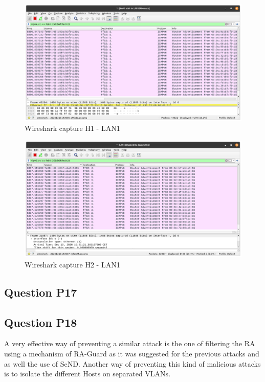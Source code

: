 \inputminted{text}{files/P16_before_flood.txt}
\label{log:P16_before_flood}

\inputminted{text}{files/P16_after_flood.txt}
\label{log:P16_after_flood}

\begin{figure}[H]
	\centering
	\includegraphics[width=\linewidth]{images/P16_H1_LAN2.png}
	\caption{Wireshark capture H1 - LAN1}
	\label{fig:P16_H1_LAN2}
\end{figure}

\begin{figure}[H]
	\centering
	\includegraphics[width=\linewidth]{images/P16_H2_LAN1.png}
	\caption{Wireshark capture H2 - LAN1}
	\label{fig:P16_H2_LAN1}
\end{figure}

\subsection{Question P17}


\subsection{Question P18}
A very effective way of preventing a similar attack is the one of filtering the RA using a mechanism of RA-Guard as it was suggested for the previous attacks and as well the use of SeND. Another way of preventing this kind of malicious attacks is to isolate the different Hosts on separated VLANs.

